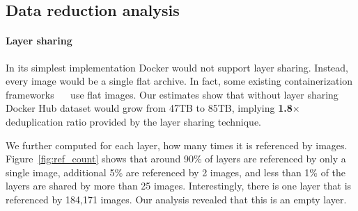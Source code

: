 \subsection{Data reduction analysis} 
\label{sec:dedup_ratio}

%
%
%

\paragraph{Layer sharing}

%

In its simplest implementation Docker would not support layer sharing.
%
Instead, every image would be a single flat archive.
%
In fact, some existing containerization frameworks
~\cite{singularity}~\cite{openvz} 
%
%
%
%
use flat images.
%
Our estimates show that without layer sharing Docker Hub dataset would grow
from 47TB to 85TB, implying \textbf{1.8$\times$} deduplication ratio provided
by the layer sharing technique.
 
We further computed for each layer, how many times it is referenced by images.
%
Figure~\ref{fig:ref_count} shows that around 90\% of layers are referenced by
only a single image, additional 5\% are referenced by 2 images, and less than
1\% of the layers are shared by more than 25 images.
%
%
%
%
%
%
%
Interestingly, there is one layer that is referenced by 184,171 images.  Our
analysis revealed that this is an empty layer.
%
%
%

